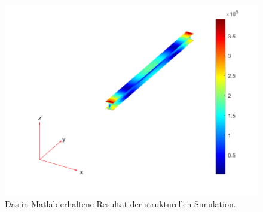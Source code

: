 %
%
%
\begin{figure}
    \centering
    \includegraphics[width=\textwidth]{papers/fem/images/balken_resultat.pdf}
    \caption{Das in Matlab erhaltene Resultat der strukturellen Simulation.}
    \label{fem:anw:resultat}
    \end{figure}
    